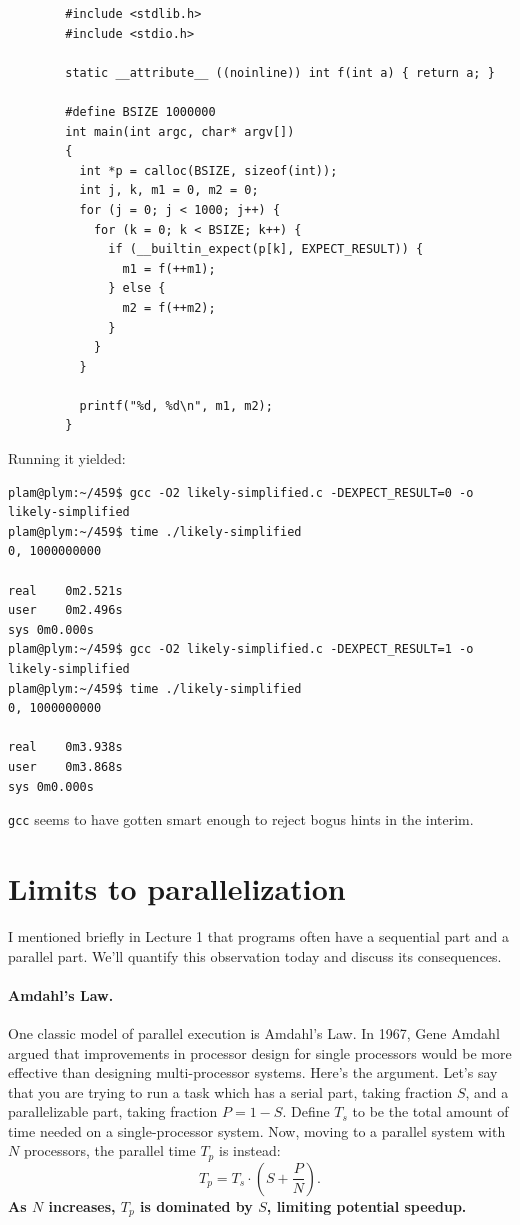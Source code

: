 \documentclass[11pt]{article}
\begin{document}
{\tiny
\begin{verbatim}
        #include <stdlib.h>
        #include <stdio.h>

        static __attribute__ ((noinline)) int f(int a) { return a; }

        #define BSIZE 1000000
        int main(int argc, char* argv[]) 
        {
          int *p = calloc(BSIZE, sizeof(int));
          int j, k, m1 = 0, m2 = 0;
          for (j = 0; j < 1000; j++) {
            for (k = 0; k < BSIZE; k++) {
              if (__builtin_expect(p[k], EXPECT_RESULT)) {
                m1 = f(++m1);
              } else {
                m2 = f(++m2);
              }
            }
          }

          printf("%d, %d\n", m1, m2);
        }
\end{verbatim}
}
Running it yielded:
\begin{verbatim}
plam@plym:~/459$ gcc -O2 likely-simplified.c -DEXPECT_RESULT=0 -o likely-simplified
plam@plym:~/459$ time ./likely-simplified
0, 1000000000

real	0m2.521s
user	0m2.496s
sys	0m0.000s
plam@plym:~/459$ gcc -O2 likely-simplified.c -DEXPECT_RESULT=1 -o likely-simplified
plam@plym:~/459$ time ./likely-simplified
0, 1000000000

real	0m3.938s
user	0m3.868s
sys	0m0.000s
\end{verbatim}
{\tt gcc} seems to have gotten smart enough to reject bogus hints in the interim.

\section*{Limits to parallelization}
I mentioned briefly in Lecture 1 that programs often have a sequential
part and a parallel part. We'll quantify this observation today
and discuss its consequences.

\paragraph{Amdahl's Law.} One classic model of parallel execution
is Amdahl's Law. In 1967, Gene Amdahl argued that improvements in
processor design for single processors would be more effective than
designing multi-processor systems. Here's the argument. Let's say that
you are trying to run a task which has a serial part, taking fraction 
$S$, and a parallelizable part, taking fraction $P = 1-S$. Define $T_s$
to be the total 
amount of time needed on a single-processor system.
Now, moving to a parallel system with $N$ processors, the parallel
time $T_p$ is instead:
\[ T_p = T_s \cdot (S + \frac{P}{N}). \]
{\bf As $N$ increases, $T_p$ is dominated by $S$, limiting potential
speedup.}
\end{document}
